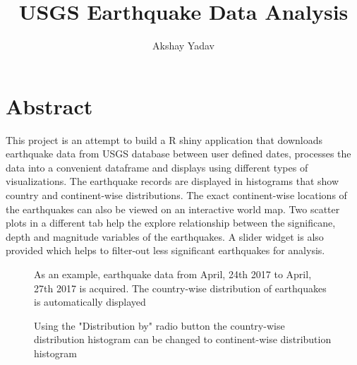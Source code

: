 \documentclass{article}
\date{}
\title{USGS Earthquake Data Analysis}
\author{Akshay Yadav}
\begin{document}
	\maketitle
	\section{Abstract}
		This project is an attempt to build a R shiny application that downloads earthquake data from USGS database between user defined dates, processes the data into a convenient dataframe and displays using different types of visualizations. The earthquake records are displayed in histograms that show country and continent-wise distributions. The exact continent-wise locations of the earthquakes can also be viewed on an interactive world map. Two scatter plots in a different tab help the explore relationship between the significane, depth and magnitude variables of the earthquakes. A slider widget is also provided which helps to filter-out less significant earthquakes for analysis. 
		
		\begin{figure}
			\caption{As an example, earthquake data from April, 24th 2017 to April, 27th 2017 is acquired. The country-wise distribution of earthquakes is automatically displayed}
		\end{figure}
		
		\begin{figure}
			\caption{Using the "Distribution by" radio button the country-wise distribution histogram can be changed to continent-wise distribution histogram}
		\end{figure}
		
\end{document}
